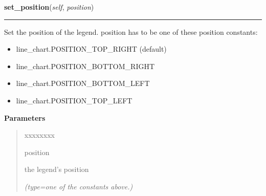 \hspace{.8\funcindent}\begin{boxedminipage}{\funcwidth}

    \raggedright \textbf{set\_position}(\textit{self}, \textit{position})

    \vspace{-1.5ex}

    \rule{\textwidth}{0.5\fboxrule}
\setlength{\parskip}{2ex}
    Set the position of the legend. position has to be one of these 
    position constants:

    \begin{itemize}
    \setlength{\parskip}{0.6ex}
      \item line\_chart.POSITION\_TOP\_RIGHT (default)

      \item line\_chart.POSITION\_BOTTOM\_RIGHT

      \item line\_chart.POSITION\_BOTTOM\_LEFT

      \item line\_chart.POSITION\_TOP\_LEFT

    \end{itemize}

\setlength{\parskip}{1ex}
      \textbf{Parameters}
      \vspace{-1ex}

      \begin{quote}
        \begin{Ventry}{xxxxxxxx}

          \item[position]

          the legend's position

            {\it (type=one of the constants above.)}

        \end{Ventry}

      \end{quote}

    \end{boxedminipage}

    \label{pygtk_chart:line_chart:Legend:get_position}

    \vspace{0.5ex}

